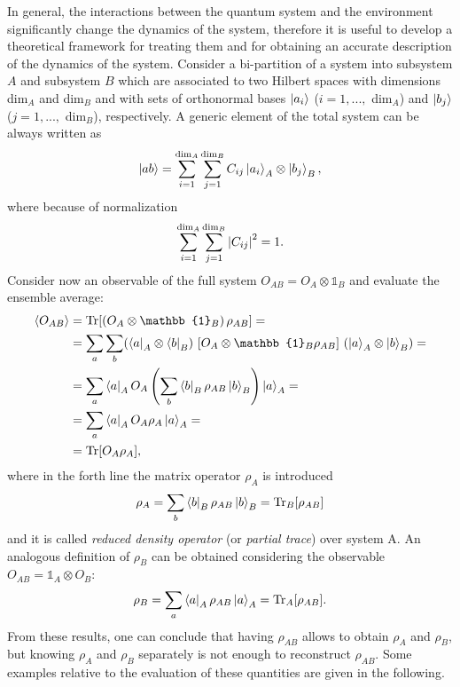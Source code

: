 In general, the interactions between the quantum system and the environment significantly change the dynamics of the system, therefore it is useful to develop a theoretical framework for treating them and for obtaining an accurate description of the dynamics of the system. Consider a bi-partition of a system into subsystem $A$ and subsystem $B$ which are associated to two Hilbert spaces with dimensions dim$_A$ and dim$_B$ and with sets of orthonormal bases $\ket{a_i}$ ($i = 1, ...,$ dim$_A$) and $\ket{b_j}$ ($j = 1, ...,$ dim$_B$), respectively. A generic element of the total system can be always written as 
\begin{align*}
    \ket{ab} = \sum_{i = 1}^{\text{dim}_A} \sum_{j = 1}^{\text{dim}_B} C_{ij} \ket{a_i}_A \otimes \ket{b_j}_B,
\end{align*}
where because of normalization 
\begin{align*}
    \sum_{i = 1}^{\text{dim}_A} \sum_{j = 1}^{\text{dim}_B} \abs{C_{ij}}^2 = 1.
\end{align*}
Consider now an observable of the full system $O_{AB} = O_A \otimes \mathbb{1}_B$ and evaluate the ensemble average:  
\begin{align*}
    \langle O_{AB} \rangle &= \text{Tr}[\left( O_A \otimes \mathbb{1}_B \right) \rho_{AB}] = \\
    &= \sum_a \sum_b (\bra{a}_A \otimes \bra{b}_B) \, \left[O_A \otimes \mathbb{1}_B \rho_{AB}\right] \, ( \ket{a}_A \otimes \ket{b}_B )= \\
    &= \sum_a \bra{a}_A O_A \left( \sum_b \bra{b}_B \rho_{AB} \ket{b}_B \right) \ket{a}_A = \\
    &= \sum_a \bra{a}_A O_A \rho_A \ket{a}_A = \\
    &= \text{Tr}[O_A \rho_A],
\end{align*}
where in the forth line the matrix operator $\rho_A$ is introduced
\begin{align}
    \rho_A = \sum_b \bra{b}_B \rho_{AB} \ket{b}_B = \text{Tr}_B[\rho_{AB}]
    \label{eq:rhoA}
\end{align}
and it is called \textit{reduced density operator} (or \emph{partial trace}) over system A. 
An analogous definition of $\rho_B$ can be obtained considering the observable $O_{AB} = \mathbb{1}_A \otimes O_B$:
\begin{align}
    \rho_B = \sum_a \bra{a}_A \rho_{AB} \ket{a}_A = \text{Tr}_A[\rho_{AB}].
    \label{eq:rhoB}
\end{align}
From these results, one can conclude that having $\rho_{AB}$ allows to obtain $\rho_A$ and $\rho_B$, but knowing $\rho_A$ and $\rho_B$ separately is not enough to reconstruct $\rho_{AB}$. Some examples relative to the evaluation of these quantities are given in the following. 

